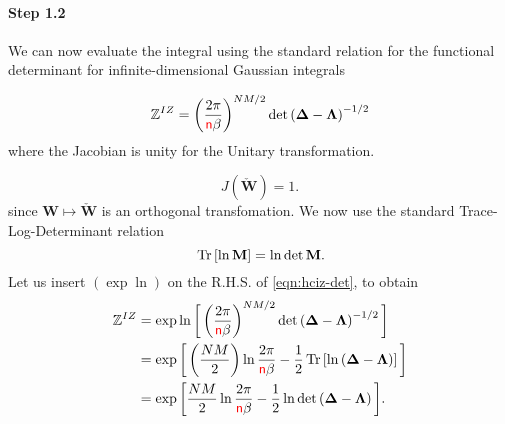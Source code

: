 \paragraph{Step 1.2}

We can now evaluate the
integral using the standard relation for the functional determinant for infinite-dimensional Gaussian integrals~\cite{EngelAndVanDenBroeck}

\begin{equation}
\label{eqn:hciz-det}
    \mathbb{Z}^{IZ}=\left(\dfrac{2\pi}{{\color{red}\sf{n}}\beta}\right)^{NM/2}\det\left(\mathbf{\Delta}-\mathbf{\Lambda}\right)^{-1/2}
\end{equation}
where the Jacobian is unity for the Unitary transformation.

\begin{equation}\label{eqn:Jacobian}
    J(\mathbf{\check{W}})=1  .
\end{equation}
since $\mathbf{W} \mapsto \check{\mathbf{W}}$  is an orthogonal transfomation.
We now use the standard Trace-Log-Determinant relation~\cite{EngelAndVanDenBroeck}
\begin{equation}\label{eqn:tr-ln-det}
    \mbox{}\operatorname{Tr}\left[\ln\mathbf{M}\right]=\ln\det\mathbf{M}  .
\end{equation}
Let us insert $(\exp\ln)$ on the R.H.S. of \ref{eqn:hciz-det}, to obtain
\begin{align}
\nonumber
\mathbb{Z}^{IZ}
  &=\exp\ln\bigg[\left(\dfrac{2\pi}{{\color{red}\sf{n}}\beta}\right)^{NM/2}\det\left(\mathbf{\Delta}-\mathbf{\Lambda}\right)^{-1/2}\bigg] \\ 
\nonumber
  & =\exp\bigg[\left(\dfrac{NM}{2}\right)\ln\dfrac{2\pi}{{\color{red}\sf{n}}\beta}-\dfrac{1}{2}\mbox{}\operatorname{Tr}\left[\ln\left(\mathbf{\Delta}-\mathbf{\Lambda}
\right)\right]\bigg] \\ 
\label{eqn:hciz-exp-ln}
  & =\exp\bigg[\dfrac{NM}{2}\ln\dfrac{2\pi}{{\color{red}\sf{n}}\beta}-\dfrac{1}{2}\ln\det\left(\mathbf{\Delta}-\mathbf{\Lambda}\right)\bigg]  .
\end{align}


